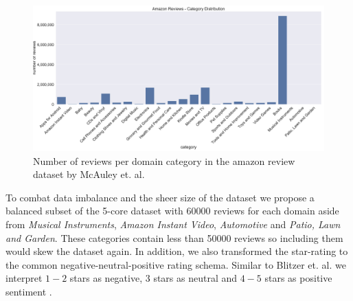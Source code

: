 \begin{figure}
	\centering
	\includegraphics[width=\textwidth]{figures/05_setup/05_amazonReviewsCategories}
	\caption{Number of reviews per domain category in the amazon review dataset by McAuley et. al. \cite{McAuley2015}}
	\label{fig:05_amazonDatasetDistributin}
\end{figure}

To combat data imbalance and the sheer size of the dataset we propose a balanced subset of the 5-core dataset with 60000 reviews for each domain aside from \textit{Musical Instruments}, \textit{Amazon Instant Video}, \textit{Automotive} and \textit{Patio, Lawn and Garden}. These categories contain less than 50000 reviews so including them would skew the dataset again. In addition, we also transformed the star-rating to the common negative-neutral-positive rating schema. Similar to Blitzer et. al. we interpret $1-2$ stars as negative, 3 stars as neutral and $4-5$ stars as positive sentiment \cite{Blitzer2007}.
\medskip

